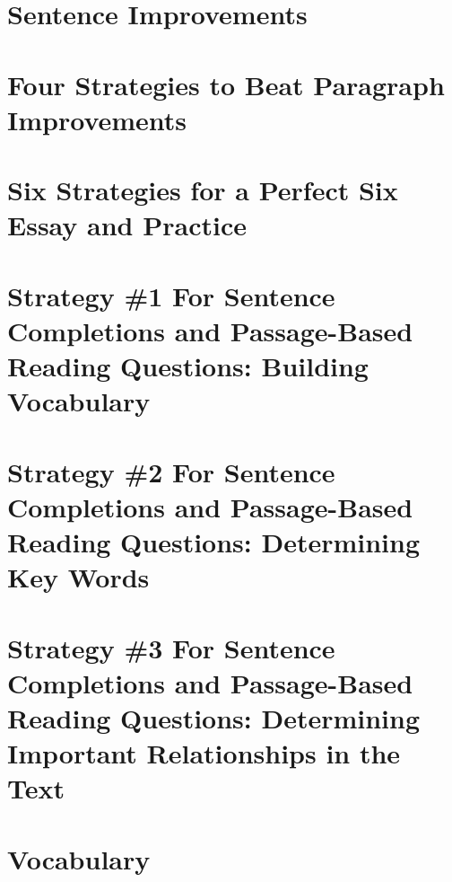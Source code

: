 \documentclass[12pt]{book}
\begin{document}
\chapter{Sentence Improvements}
	
	
	
	
	

\chapter{Four Strategies to Beat Paragraph Improvements}
	
	
	
	
	
	

\chapter{Six Strategies for a Perfect Six Essay and Practice}
	
	
	
	
	
	
	
	

\chapter{Strategy \#1 For Sentence Completions and Passage-Based Reading Questions: Building Vocabulary}
	
	
	
	
	
	
	
	
	
	
	
	
	

\chapter{Strategy \#2 For Sentence Completions and Passage-Based Reading Questions: Determining Key Words}
	
	
	
	
	
	
	

\chapter{Strategy \#3 For Sentence Completions and Passage-Based Reading Questions: Determining Important Relationships in the Text}
	
	
	
	
	

\chapter{Vocabulary}
	


\end{document}
